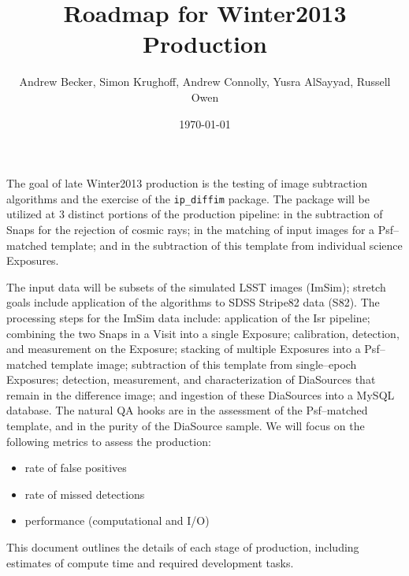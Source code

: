 \documentclass[prd, nofootinbib, floatfix, 11pt,tightenlines,times]{article}
\author{Andrew Becker, Simon Krughoff, Andrew Connolly, Yusra AlSayyad, Russell Owen}
\title{Roadmap for Winter2013 Production}
\date{\today}
\begin{document}
\maketitle

The goal of late Winter2013 production is the testing of image
subtraction algorithms and the exercise of the {\tt ip\_diffim}
package.  The package will be utilized at 3 distinct portions of the
production pipeline: in the subtraction of Snaps for the rejection of
cosmic rays; in the matching of input images for a Psf--matched
template; and in the subtraction of this template from individual
science Exposures.

The input data will be subsets of the simulated LSST images (ImSim);
stretch goals include application of the algorithms to SDSS Stripe82
data (S82).  The processing steps for the ImSim data include:
application of the Isr pipeline; combining the two Snaps in a Visit
into a single Exposure; calibration, detection, and measurement on the
Exposure; stacking of multiple Exposures into a Psf--matched template
image; subtraction of this template from single--epoch Exposures;
detection, measurement, and characterization of DiaSources that remain
in the difference image; and ingestion of these DiaSources into a
MySQL database.  The natural QA hooks are in the assessment of the
Psf--matched template, and in the purity of the DiaSource sample.  We
will focus on the following metrics to assess the production:
\begin{itemize}
\item rate of false positives
\item rate of missed detections
\item performance (computational and I/O)
\end{itemize}
This document outlines the details of each stage of production, 
including estimates of compute time and required development tasks.

\clearpage
\tableofcontents
\clearpage

\end{document}

